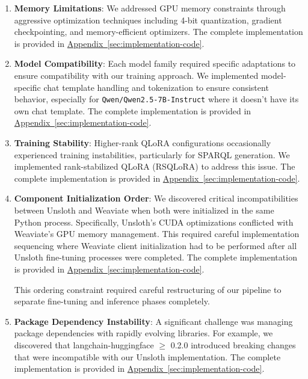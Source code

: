 \begin{enumerate}
    \item \textbf{Memory Limitations}: We addressed GPU memory constraints through aggressive optimization techniques including 4-bit quantization, gradient checkpointing, and memory-efficient optimizers. The complete implementation is provided in \hyperref[code:memory-optimization]{Appendix~\ref{sec:implementation-code}}.
    
    \item \textbf{Model Compatibility}: Each model family required specific adaptations to ensure compatibility with our training approach. We implemented model-specific chat template handling and tokenization to ensure consistent behavior, especially for \texttt{Qwen/Qwen2.5-7B-Instruct} where it doesn't have its own chat template. The complete implementation is provided in \hyperref[code:model-compatibility]{Appendix~\ref{sec:implementation-code}}.
    
    \item \textbf{Training Stability}: Higher-rank QLoRA configurations occasionally experienced training instabilities, particularly for SPARQL generation. We implemented rank-stabilized QLoRA (RSQLoRA) to address this issue. The complete implementation is provided in \hyperref[code:training-stability]{Appendix~\ref{sec:implementation-code}}.
        
    \item \textbf{Component Initialization Order}: We discovered critical incompatibilities between Unsloth and Weaviate when both were initialized in the same Python process. Specifically, Unsloth's CUDA optimizations conflicted with Weaviate's GPU memory management. This required careful implementation sequencing where Weaviate client initialization had to be performed after all Unsloth fine-tuning processes were completed. The complete implementation is provided in \hyperref[code:initialization-order]{Appendix~\ref{sec:implementation-code}}.

    This ordering constraint required careful restructuring of our pipeline to separate fine-tuning and inference phases completely.

    \item \textbf{Package Dependency Instability}: A significant challenge was managing package dependencies with rapidly evolving libraries. For example, we discovered that langchain-huggingface $\geq$ 0.2.0 introduced breaking changes that were incompatible with our Unsloth implementation. The complete implementation is provided in \hyperref[code:dependency-issue]{Appendix~\ref{sec:implementation-code}}.
    

\end{enumerate}
